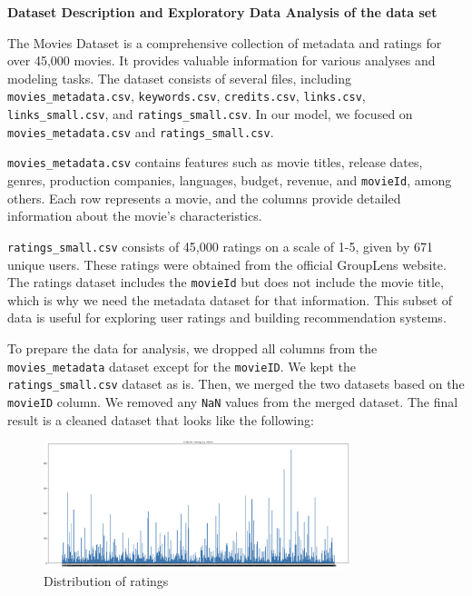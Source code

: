 \documentclass{article}
\begin{document}
\vspace{0.3cm}
\vspace{0.5cm}

    \begin{flushleft}
        \textbf{\LARGE Dataset Description and Exploratory Data Analysis of the data set}
    \end{flushleft}


The Movies Dataset is a comprehensive collection of metadata and ratings for over 45,000 movies. It provides valuable information for various analyses and modeling tasks. The dataset consists of several files, including \texttt{movies\_metadata.csv}, \texttt{keywords.csv}, \texttt{credits.csv}, \texttt{links.csv}, \texttt{links\_small.csv}, and \texttt{ratings\_small.csv}. In our model, we focused on \texttt{movies\_metadata.csv} and \texttt{ratings\_small.csv}.

\vspace{0.3cm}

\texttt{movies\_metadata.csv} contains features such as movie titles, release dates, genres, production companies, languages, budget, revenue, and \texttt{movieId}, among others. Each row represents a movie, and the columns provide detailed information about the movie's characteristics.

\vspace{0.3cm}

\texttt{ratings\_small.csv} consists of 45,000 ratings on a scale of 1-5, given by 671 unique users. These ratings were obtained from the official GroupLens website. The ratings dataset includes the \texttt{movieId} but does not include the movie title, which is why we need the metadata dataset for that information. This subset of data is useful for exploring user ratings and building recommendation systems.

\vspace{0.3cm}

To prepare the data for analysis, we dropped all columns from the \texttt{movies\_metadata} dataset except for the \texttt{movieID}. We kept the \texttt{ratings\_small.csv} dataset as is. Then, we merged the two datasets based on the \texttt{movieID} column. We removed any \texttt{NaN} values from the merged dataset. The final result is a cleaned dataset that looks like the following: 

\vspace{0.3cm}

\begin{figure}[H]
  \centering
  \includegraphics[width=0.8\textwidth]{image/ratings.png}
  \caption{Distribution of ratings}
\end{figure}
\end{document}
